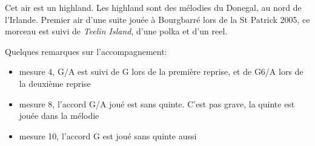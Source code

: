 Cet air est un highland. Les highland sont des mélodies du Donegal, au nord de
l'Irlande. Premier air d'une suite jouée à Bourgbarré lors de la St Patrick
2005, ce morceau est suivi de \emph{Teelin Island}, d'une polka et d'un reel.

\chords {
  \AMaj
  \Dva
  \GbA
  \Gvb
  \EmbA
  \Aminva
  \GbAvb
  \Gvc
}

\tune

Quelques remarques sur l'accompagnement:
\begin{itemize}
\item mesure 4, G/A est suivi de G lors de la première reprise, et de G6/A
  lors de la deuxième reprise
\item mesure 8, l'accord G/A joué est sans quinte. C'est pas grave, la quinte
  est jouée dans la mélodie
\item mesure 10, l'accord G est joué sans quinte aussi
\end{itemize}
